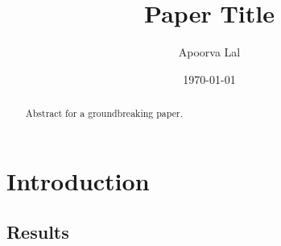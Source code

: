 \documentclass[12pt,reqno]{amsart} %
\title{Paper Title}
\author{Apoorva Lal}
\date{\today}
\begin{document}
\begin{abstract} Abstract for a groundbreaking paper.
\end{abstract}

\maketitle



\linenumbers
\modulolinenumbers[5]
\section{Introduction} \label{intro}

\subsection{Results}

\lipsum[5]


\textcite{sutton2018reinforcement}


\renewcommand{\mkbibnamefamily}[1]{\textsc{#1}}
\printbibliography

\newpage
\renewcommand{\thetable}{A\arabic{table}}
\renewcommand{\thefigure}{A\arabic{figure}}
\setcounter{table}{0}
\setcounter{figure}{0}
\end{document}
